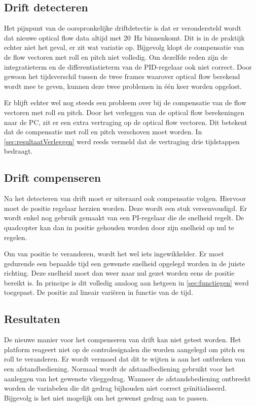 \subsection{Drift detecteren}
Het pijnpunt van de oorspronkelijke driftdetectie is dat er verondersteld wordt dat nieuwe optical flow data altijd met \SI{20}{\Hz} binnenkomt. Dit is in de praktijk echter niet het geval, er zit wat variatie op. Bijgevolg klopt de compensatie van de flow vectoren met roll en pitch niet volledig. Om dezelfde reden zijn de integratieterm en de differentiatieterm van de PID-regelaar ook niet correct. Door gewoon het tijdsverschil tussen de twee frames waarover optical flow berekend wordt mee te geven, kunnen deze twee problemen in \'e\'en keer worden opgelost.

\npar Er blijft echter wel nog steeds een probleem over bij de compensatie van de flow vectoren met roll en pitch. Door het verleggen van de optical flow berekeningen naar de PC, zit er een extra vertraging op de optical flow vectoren. Dit betekent dat de compensatie met roll en pitch verschoven moet worden. In \ref{sec:resultaatVerleggen} werd reeds vermeld dat de vertraging drie tijdstappen bedraagt.

\subsection{Drift compenseren}
Na het detecteren van drift moet er uiteraard ook compensatie volgen. Hiervoor moet de positie regelaar herzien worden. Deze wordt een stuk vereenvoudigd. Er wordt enkel nog gebruik gemaakt van een PI-regelaar die de snelheid regelt. De quadcopter kan dan in positie gehouden worden door zijn snelheid op nul te regelen.

\npar Om van positie te veranderen, wordt het wel iets ingewikkelder. Er moet gedurende een bepaalde tijd een gewenste snelheid opgelegd worden in de juiste richting. Deze snelheid moet dan weer naar nul gezet worden eens de positie bereikt is. In principe is dit volledig analoog aan hetgeen in \ref{sec:functiegen} werd toegepast. De positie zal lineair vari\"eren in functie van de tijd.

\subsection{Resultaten}
De nieuwe manier voor het compenseren van drift kan niet getest worden. Het platform reageert niet op de controlesignalen die worden aangelegd om pitch en roll te veranderen. Er wordt vermoed dat dit te wijten is aan het ontbreken van een afstandbediening. Normaal wordt de afstandbediening gebruikt voor het aanleggen van het gewenste vlieggedrag. Wanneer de afstandsbediening ontbreekt worden de variabelen die dit gedrag bijhouden niet correct ge\"initialiseerd. Bijgevolg is het niet mogelijk om het gewenst gedrag aan te passen.

